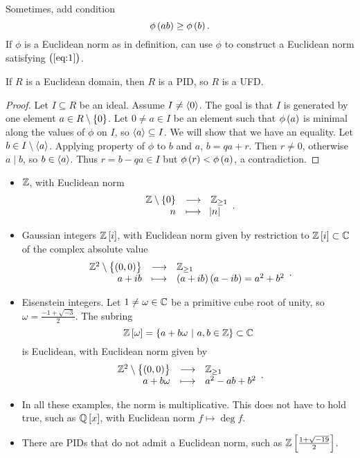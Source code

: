Sometimes, add condition
\begin{equation}
\label{eq:1}
\phi\br{ab} \ge \phi\br{b}.
\end{equation}
If $ \phi $ is a Euclidean norm as in definition, can use $ \phi $ to construct a Euclidean norm satisfying $ \br{\ref{eq:1}} $.

\begin{theorem}
If $ R $ is a Euclidean domain, then $ R $ is a PID, so $ R $ is a UFD.
\end{theorem}


\begin{proof}
Let $ I \subseteq R $ be an ideal. Assume $ I \ne \left\langle 0 \right\rangle $. The goal is that $ I $ is generated by one element $ a \in R \setminus \cbr{0} $. Let $ 0 \ne a \in I $ be an element such that $ \phi\br{a} $ is minimal along the values of $ \phi $ on $ I $, so $ \left\langle a \right\rangle \subseteq I $. We will show that we have an equality. Let $ b \in I \setminus \left\langle a \right\rangle $. Applying property of $ \phi $ to $ b $ and $ a $, $ b = qa + r $. Then $ r \ne 0 $, otherwise $ a \mid b $, so $ b \in \left\langle a \right\rangle $. Thus $ r = b - qa \in I $ but $ \phi\br{r} < \phi\br{a} $, a contradiction.
\end{proof}

\begin{example*}
\hfill
\begin{itemize}
\item $ \mathbb{Z} $, with Euclidean norm
$$ \function{\ZZ \setminus \cbr{0}}{\ZZ_{\ge 1}}{n}{\abs{n}}. $$
\item Gaussian integers $ \ZZ\sbr{i} $, with Euclidean norm given by restriction to $ \ZZ\sbr{i} \subset \CC $ of the complex absolute value
$$ \function{\ZZ^2 \setminus \cbr{\br{0, 0}}}{\ZZ_{\ge 1}}{a + ib}{\br{a + ib}\br{a - ib} = a^2 + b^2}. $$
\item Eisenstein integers. Let $ 1 \ne \omega \in \mathbb{C} $ be a primitive cube root of unity, so $ \omega = \tfrac{-1 + \sqrt{-3}}{2} $. The subring
$$ \ZZ\sbr{\omega} = \cbr{a + b\omega \st a, b \in \ZZ} \subset \CC $$
is Euclidean, with Euclidean norm given by
$$ \function{\ZZ^2 \setminus \cbr{\br{0, 0}}}{\ZZ_{\ge 1}}{a + b\omega}{a^2 - ab + b^2}. $$
\end{itemize}
\end{example*}

\begin{remark*}
\hfill
\begin{itemize}
\item In all these examples, the norm is multiplicative. This does not have to hold true, such as $ \QQ\sbr{x} $, with Euclidean norm $ f \mapsto \deg f $.
\item There are PIDs that do not admit a Euclidean norm, such as $ \ZZ\sbr{\tfrac{1 + \sqrt{-19}}{2}} $.
\end{itemize}
\end{remark*}

